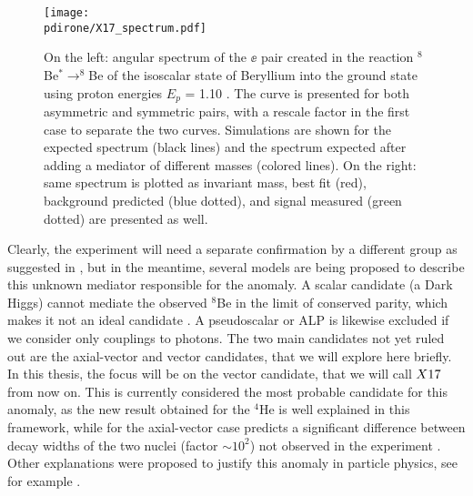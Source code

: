 \begin{figure}[htb!]
  \centering
  \texttt{[image: \\pdirone/X17\_spectrum.pdf]}
  \caption[$^8$Be anomaly]{On the left: angular spectrum of the $\ee$ pair created in the reaction $^8$Be$^* \to ^8$Be of the isoscalar state of Beryllium into the ground state using proton energies $E_p$ = 1.10 \mev. The curve is presented for both asymmetric and symmetric pairs, with a rescale factor in the first case to separate the two curves. Simulations are shown for the expected spectrum (black lines) and the spectrum expected after adding a mediator of different masses (colored lines). On the right: same spectrum is plotted as invariant mass, best fit (red), background predicted (blue dotted), and signal measured (green dotted) are presented as well. \cite{Krasznahorkay:2015iga}}
  \label{fig:be-anomaly}
\end{figure}

Clearly, the experiment will need a separate confirmation by a different group as suggested in \cite{Feng:2020mbt}, but in the meantime, several models are being proposed to describe this unknown mediator responsible for the anomaly. A scalar candidate (a Dark Higgs) cannot mediate the observed $^8$Be in the limit of conserved parity, which makes it not an ideal candidate \cite{PhysRevD.95.035017}. A pseudoscalar or ALP is likewise excluded if we consider only couplings to photons. The two main candidates not yet ruled out are the axial-vector and vector candidates, that we will explore here briefly. In this thesis, the focus will be on the vector candidate, that we will call $X17$ from now on. This is currently considered the most probable candidate for this anomaly, as the new result obtained for the $^4$He is well explained in this framework, while for the axial-vector case predicts a significant difference between decay widths of the two nuclei (factor $\sim10^2$) not observed in the experiment \cite{Feng:2020mbt}. Other explanations were proposed to justify this anomaly in particle physics, see for example \cite{Nam:2019osu, Seto:2016pks}.

